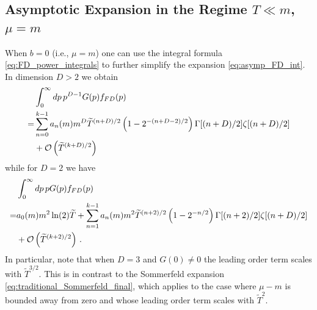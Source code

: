 \documentclass[sn-mathphys,Numbered]{sn-jnl}
\begin{document}
\subsection{Asymptotic Expansion in the Regime $T\ll m$, $\mu=m$}\label{sec:b_0}
When $b=0$ (i.e., $\mu=m$) one can use the integral formula \eqref{eq:FD_power_integrals} to further simplify the expansion \eqref{eq:asymp_FD_int}. In dimension $D>2$ we obtain
\begin{align}\label{eq:asymp_FD_int_b_0}
&\int_0^\infty dp\, p^{D-1} G(p) f_{FD}(p)\notag\\
   =&\sum_{n=0}^{k-1} a_n(m)m^{D}\widetilde{T}^{(n+D)/2}\left(1-2^{-(n+D-2)/2}\right)\Gamma[(n+D)/2]\zeta[(n+D)/2]\\
   &+\mathcal{O}\left(\widetilde{T}^{(k+D)/2}\right)\notag
\end{align}
while for $D=2$  we have
\begin{align}\label{eq:asymp_FD_int_b_D2}
&\int_0^\infty dp\, p G(p) f_{FD}(p)\notag\\
   =& a_0(m)m^2  \ln(2)\widetilde{T}+ 
   \sum_{n=1}^{k-1} a_n(m)m^{2}\widetilde{T}^{(n+2)/2}\left(1-2^{-n/2}\right)\Gamma[(n+2)/2]\zeta[(n+D)/2]\\
   &+\mathcal{O}\left(\widetilde{T}^{(k+2)/2}\right)\,.\notag
\end{align}
In particular, note that when $D=3$ and $G(0)\neq 0$ the leading order term scales with $\widetilde{T}^{3/2}$.  This is in contrast to the  Sommerfeld expansion \eqref{eq:traditional_Sommerfeld_final}, which  applies to the case where $\mu-m$ is bounded away from zero and whose leading order term scales with $\widetilde{T}^2$.
\end{document}
